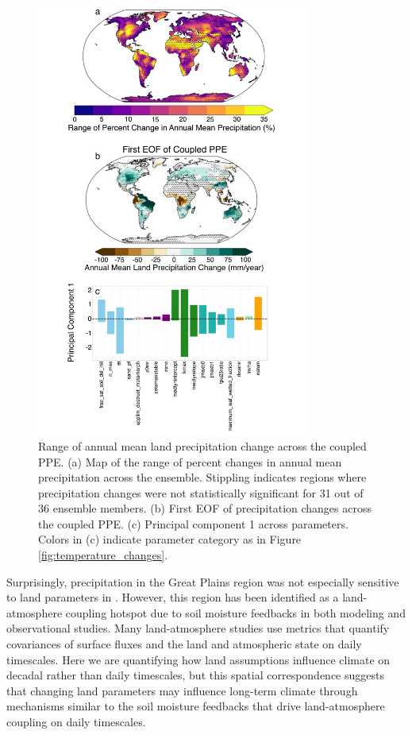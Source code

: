\documentclass[draft]{agujournal2019}
\begin{document}
\begin{figure}
\centering
\noindent\includegraphics[width=0.8\textwidth]{figs/Figure3.pdf}
\caption{Range of annual mean land precipitation change across the coupled PPE. (a) Map of the range of percent changes in annual mean precipitation across the ensemble. Stippling indicates regions where precipitation changes were not statistically significant for 31 out of 36 ensemble members. (b) First EOF of precipitation changes across the coupled PPE. (c) Principal component 1 across parameters. Colors in (c) indicate parameter category as in Figure \ref{fig:temperature_changes}.}
\label{fig:precip_changes}
\end{figure}

Surprisingly, precipitation in the Great Plains region was not especially sensitive to land parameters in \cite{fischer_quantifying_2011}. However, this region has been identified as a land-atmosphere coupling hotspot due to soil moisture feedbacks in both modeling \citep{koster_glace_2006, santanello_landatmosphere_2018, zheng_impacts_2015} and observational \citep{ferguson_global_2012, abdolghafoorian_validating_2021} studies. Many land-atmosphere studies use metrics that quantify covariances of surface fluxes and the land and atmospheric state on daily timescales. Here we are quantifying how land assumptions influence climate on decadal rather than daily timescales, but this spatial correspondence suggests that changing land parameters may influence long-term climate through mechanisms similar to the soil moisture feedbacks that drive land-atmosphere coupling on daily timescales.
\end{document}
